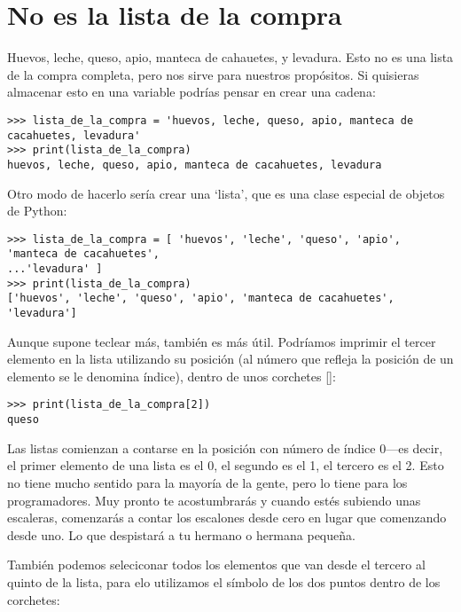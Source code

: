 \section{No es la lista de la compra}

Huevos, leche, queso, apio, manteca de cahauetes, y levadura. Esto no es una lista de la compra completa, pero nos sirve para nuestros propósitos. Si quisieras almacenar esto en una variable podrías pensar en crear una cadena:

\begin{listing}
\begin{verbatim}
>>> lista_de_la_compra = 'huevos, leche, queso, apio, manteca de cacahuetes, levadura'
>>> print(lista_de_la_compra)
huevos, leche, queso, apio, manteca de cacahuetes, levadura
\end{verbatim}
\end{listing}

Otro modo de hacerlo sería crear una `lista', que es una clase especial de objetos de Python:

\begin{listing}
\begin{verbatim}
>>> lista_de_la_compra = [ 'huevos', 'leche', 'queso', 'apio', 'manteca de cacahuetes',
...'levadura' ]
>>> print(lista_de_la_compra)
['huevos', 'leche', 'queso', 'apio', 'manteca de cacahuetes', 'levadura']
\end{verbatim}
\end{listing}

Aunque supone teclear más, también es más útil. Podríamos imprimir el tercer elemento en la lista utilizando su posición (al número que refleja la posición de un elemento se le denomina índice), dentro de unos corchetes []: 

\begin{listing}
\begin{verbatim}
>>> print(lista_de_la_compra[2])
queso
\end{verbatim}
\end{listing}

Las listas comienzan a contarse en la posición con número de índice 0---es decir, el primer elemento de una lista es el 0, el segundo es el 1, el tercero es el 2. Esto no tiene mucho sentido para la mayoría de la gente, pero lo tiene para los programadores. Muy pronto te acostumbrarás y cuando estés subiendo unas escaleras, comenzarás a contar los escalones desde cero en lugar que comenzando desde uno. Lo que despistará a tu hermano o hermana pequeña.
\par
También podemos seleciconar todos los elementos que van desde el tercero al quinto de la lista, para elo utilizamos el símbolo de los dos puntos dentro de los corchetes:

